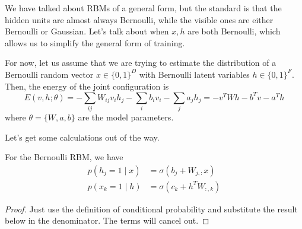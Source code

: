 \documentclass{article}
\begin{document}
    We have talked about RBMs of a general form, but the standard is that the hidden units are almost always Bernoulli, while the visible ones are either Bernoulli or Gaussian. Let's talk about when $x, h$ are both Bernoulli, which allows us to simplify the general form of training. 

    \begin{definition}
      \label{def:bernoulli-bernoulli-rbm}
      For now, let us assume that we are trying to estimate the distribution of a Bernoulli random vector $x \in \{0, 1\}^D$ with Bernoulli latent variables $h \in \{0, 1\}^F$. Then, the energy of the joint configuration is  
      \begin{equation}
        E(v, h; \theta) = - \sum_{ij} W_{ij} v_i h_j - \sum_i b_i v_i - \sum_j a_j h_j = - v^T W h - b^T v - a^T h
      \end{equation}
      where $\theta = \{W, a, b\}$ are the model parameters. 
    \end{definition}

    Let's get some calculations out of the way. 

    \begin{lemma}
      \label{thm:conditional-distributions}
 
      For the Bernoulli RBM, we have 
      \begin{align} 
        p(h_j = 1 \mid x) & = \sigma ( b_j + W_{j,:} x) \\
        p(x_k = 1 \mid h) & = \sigma ( c_k + h^T W_{:, k})
      \end{align}
    \end{lemma}
    \begin{proof}
      Just use the definition of conditional probability and substitute the result below in the denominator. The terms will cancel out. 
    \end{proof}
\end{document}
